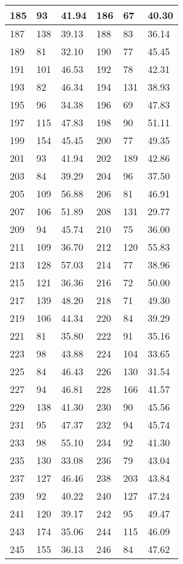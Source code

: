{\begin{longtable}{|p{3cm}|p{3cm}|p{3cm}|p{3cm}|p{3cm}|p{3cm}|}
\hline
185 & 93& 41.94 & 186 & 67& 40.30\\
\hline
187 & 138& 39.13 & 188 & 83& 36.14\\
\hline
189 & 81& 32.10 & 190 & 77& 45.45\\
\hline
191 & 101& 46.53 & 192 & 78& 42.31\\
\hline
193 & 82& 46.34 & 194 & 131& 38.93\\
\hline
195 & 96& 34.38 & 196 & 69& 47.83\\
\hline
197 & 115& 47.83 & 198 & 90& 51.11\\
\hline
199 & 154& 45.45 & 200 & 77& 49.35\\
\hline
201 & 93& 41.94 & 202 & 189& 42.86\\
\hline
203 & 84& 39.29 & 204 & 96& 37.50\\
\hline
205 & 109& 56.88 & 206 & 81& 46.91\\
\hline
207 & 106& 51.89 & 208 & 131& 29.77\\
\hline
209 & 94& 45.74 & 210 & 75& 36.00\\
\hline
211 & 109& 36.70 & 212 & 120& 55.83\\
\hline
213 & 128& 57.03 & 214 & 77& 38.96\\
\hline
215 & 121& 36.36 & 216 & 72& 50.00\\
\hline
217 & 139& 48.20 & 218 & 71& 49.30\\
\hline
219 & 106& 44.34 & 220 & 84& 39.29\\
\hline
221 & 81& 35.80 & 222 & 91& 35.16\\
\hline
223 & 98& 43.88 & 224 & 104& 33.65\\
\hline
225 & 84& 46.43 & 226 & 130& 31.54\\
\hline
227 & 94& 46.81 & 228 & 166& 41.57\\
\hline
229 & 138& 41.30 & 230 & 90& 45.56\\
\hline
231 & 95& 47.37 & 232 & 94& 45.74\\
\hline
233 & 98& 55.10 & 234 & 92& 41.30\\
\hline
235 & 130& 33.08 & 236 & 79& 43.04\\
\hline
237 & 127& 46.46 & 238 & 203& 43.84\\
\hline
239 & 92& 40.22 & 240 & 127& 47.24\\
\hline
241 & 120& 39.17 & 242 & 95& 49.47\\
\hline
243 & 174& 35.06 & 244 & 115& 46.09\\
\hline
245 & 155& 36.13 & 246 & 84& 47.62\\

\end{longtable}}
